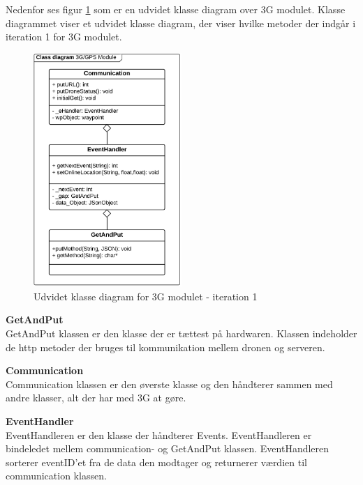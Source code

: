 Nedenfor ses figur \ref{fig:udvidet3G_it1} som er en udvidet klasse diagram over 3G modulet. Klasse diagrammet viser et udvidet klasse diagram, der viser hvilke metoder der indgår i iteration 1 for 3G modulet. 

\begin{figure}[H]
	\centering
	\includegraphics[width=0.50\textwidth]{Billeder/klasse_diagrammer/udvidet3G_iteration1.png}
	\vspace{0.5cm}
	\caption{Udvidet klasse diagram for 3G modulet - iteration 1}
	\label{fig:udvidet3G_it1}
\end{figure}

\textbf{GetAndPut} \\
GetAndPut klassen er den klasse der er tættest på hardwaren. Klassen indeholder de http metoder der bruges til kommunikation mellem dronen og serveren. 

\textbf{Communication} \\
Communication klassen er den øverste klasse og den håndterer sammen med andre klasser, alt der har med 3G at gøre.

\textbf{EventHandler} \\
EventHandleren er den klasse der håndterer Events. EventHandleren er bindeledet mellem communication- og GetAndPut klassen. EventHandleren sorterer eventID'et fra de data den modtager og returnerer værdien til communication klassen. 


\newpage

